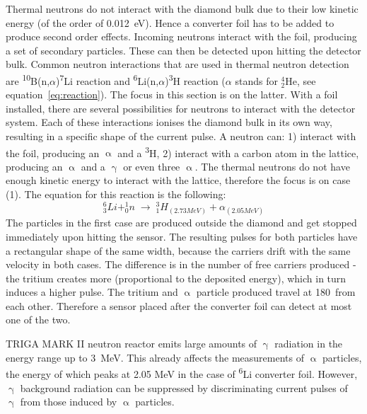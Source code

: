 Thermal neutrons do not interact with the diamond bulk due to their low kinetic energy (of the order of 0.012~eV). Hence a converter foil has to be added to produce second order effects. Incoming neutrons interact with the foil, producing a set of secondary particles. These can then be detected upon hitting the detector bulk. Common neutron interactions that are used in thermal neutron detection are \textsuperscript{10}B(n,$\alpha$)\textsuperscript{7}Li reaction and \textsuperscript{6}Li(n,$\alpha$)\textsuperscript{3}H reaction ($\alpha$ stands for $^4_2$He, see equation~\ref{eq:reaction}). The focus in this section is on the latter. With a foil installed, there are several possibilities for neutrons to interact with the detector system. Each of these interactions ionises the diamond bulk in its own way, resulting in a specific shape of the current pulse. A neutron can: 1) interact with the foil, producing an $\upalpha$ and a \textsuperscript{3}H, 2) interact with a carbon atom in the lattice, producing an $\upalpha$ and a $\upgamma$ or even three $\upalpha$. The thermal neutrons do not have enough kinetic energy to interact with the lattice, therefore the focus is on case (1). The equation for this reaction is the following:
\begin{equation}
\label{eq:reaction}
   ^6_3Li   +   ^1_0n \;\rightarrow\; ^3_1H_{(2.73 MeV)} + \alpha_{(2.05 MeV)}
\end{equation}
The particles in the first case are produced outside the diamond and get stopped immediately upon hitting the sensor. The resulting pulses for both particles have a rectangular shape of the same width, because the carriers drift with the same velocity in both cases. The difference is in the number of free carriers produced - the tritium creates more (proportional to the deposited energy), which in turn induces a higher pulse. The tritium and $\upalpha$ particle produced travel at 180~\textdegree from each other. Therefore a sensor placed after the converter foil can detect at most one of the two.

TRIGA MARK II neutron reactor emits large amounts of $\upgamma$ radiation in the energy range up to 3~MeV. This already affects the measurements of $\upalpha$ particles, the energy of which peaks at 2.05 MeV in the case of \textsuperscript{6}Li converter foil. However, $\upgamma$ background radiation can be suppressed by discriminating current pulses of $\upgamma$ from those induced by $\upalpha$ particles. 

